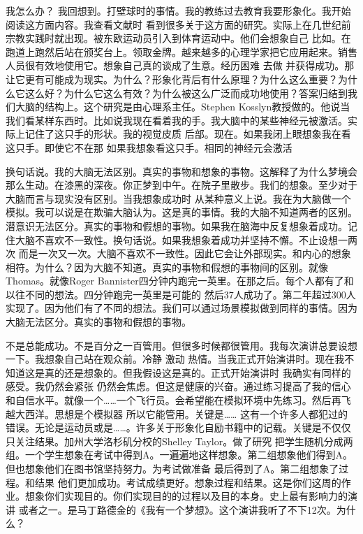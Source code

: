 我怎么办？ 我回想到。打壁球时的事情。我的教练过去教育我要形象化。我开始阅读这方面内容。我查看文献时 看到很多关于这方面的研究。实际上在几世纪前宗教实践时就出现。被东欧运动员引入到体育运动中。他们会想象自己 比如。在跑道上跑然后站在颁奖台上。领取金牌。越来越多的心理学家把它应用起来。销售人员很有效地使用它。想象自己真的谈成了生意。经历困难 去做 并获得成功。那让它更有可能成为现实。为什么？形象化背后有什么原理？为什么这么重要？为什么它这么好？为什么它这么有效？为什么被这么广泛而成功地使用？答案归结到我们大脑的结构上。这个研究是由心理系主任。Stephen Kosslyn教授做的。他说当我们看某样东西时。比如说我现在看着我的手。我大脑中的某些神经元被激活。实际上记住了这只手的形状。我的视觉皮质 后部。现在。如果我闭上眼想象我在看这只手。即使它不在那 如果我想象看这只手。相同的神经元会激活 

换句话说。我的大脑无法区别。真实的事物和想象的事物。这解释了为什么梦境会那么生动。在漆黑的深夜。你正梦到中午。在院子里散步。我们的想象。至少对于大脑而言与现实没有区别。当我想象成功时 从某种意义上说。我在为大脑做一个模拟。我可以说是在欺骗大脑认为。这是真的事情。我的大脑不知道两者的区别。潜意识无法区分。真实的事物和假想的事物。如果我在脑海中反复想象着成功。记住大脑不喜欢不一致性。换句话说。如果我想象着成功并坚持不懈。不止设想一两次 而是一次又一次。大脑不喜欢不一致性。因此它会让外部现实。和内心的想象相符。为什么？因为大脑不知道。真实的事物和假想的事物间的区别。就像Thomas。就像Roger Bannister四分钟内跑完一英里。在那之后。每个人都有了和以往不同的想法。四分钟跑完一英里是可能的 然后37人成功了。第二年超过300人实现了。因为他们有了不同的想法。我们可以通过场景模拟做到同样的事情。因为大脑无法区分。真实的事物和假想的事物。 

不是总能成功。不是百分之一百管用。但很多时候都很管用。我每次演讲总要设想一下。我想象自己站在观众前。冷静 激动 热情。当我正式开始演讲时。现在我不知道这是真的还是想象的。但我假设这是真的。正式开始演讲时 我确实有同样的感受。我仍然会紧张 仍然会焦虑。但这是健康的兴奋。通过练习提高了我的信心和自信水平。就像一个……一个飞行员。会希望能在模拟环境中先练习。然后再飞越大西洋。思想是个模拟器 所以它能管用。关键是…… 这有一个许多人都犯过的错误。无论是运动员或是……。许多关于形象化自励书籍中的记载。关键是不仅仅只关注结果。加州大学洛杉矶分校的Shelley Taylor。做了研究 把学生随机分成两组。一个学生想象在考试中得到A。一遍遍地这样想象。第二组想象他们得到A。但也想象他们在图书馆坚持努力。为考试做准备 最后得到了A。第二组想象了过程。和结果 他们更加成功。考试成绩更好。想象过程和结果。这是你们这周的作业。想象你们实现目的。你们实现目的的过程以及目的本身。史上最有影响力的演讲 或者之一。是马丁路德金的《我有一个梦想》。这个演讲我听了不下12次。为什么？ 

